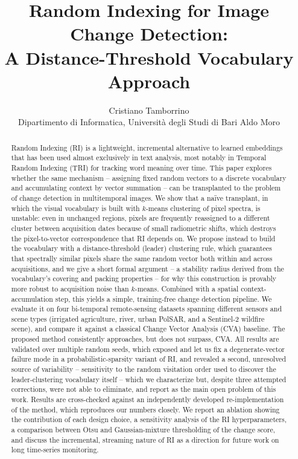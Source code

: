 \documentclass[11pt]{article}
\title{Random Indexing for Image Change Detection: \\
A Distance-Threshold Vocabulary Approach}
\author{Cristiano Tamborrino \\ Dipartimento di Informatica, Università degli Studi di Bari Aldo Moro}
\date{}
\begin{document}
\maketitle

\begin{abstract}
Random Indexing (RI) is a lightweight, incremental alternative to learned embeddings that has been used almost exclusively in text analysis, most notably in Temporal Random Indexing (TRI) for tracking word meaning over time. This paper explores whether the same mechanism -- assigning fixed random vectors to a discrete vocabulary and accumulating context by vector summation -- can be transplanted to the problem of change detection in multitemporal images. We show that a na\"ive transplant, in which the visual vocabulary is built with $k$-means clustering of pixel spectra, is unstable: even in unchanged regions, pixels are frequently reassigned to a different cluster between acquisition dates because of small radiometric shifts, which destroys the pixel-to-vector correspondence that RI depends on. We propose instead to build the vocabulary with a distance-threshold (leader) clustering rule, which guarantees that spectrally similar pixels share the same random vector both within and across acquisitions, and we give a short formal argument -- a stability radius derived from the vocabulary's covering and packing properties -- for why this construction is provably more robust to acquisition noise than $k$-means. Combined with a spatial context-accumulation step, this yields a simple, training-free change detection pipeline. We evaluate it on four bi-temporal remote-sensing datasets spanning different sensors and scene types (irrigated agriculture, river, urban PolSAR, and a Sentinel-2 wildfire scene), and compare it against a classical Change Vector Analysis (CVA) baseline. The proposed method consistently approaches, but does not surpass, CVA. All results are validated over multiple random seeds, which exposed and let us fix a degenerate-vector failure mode in a probabilistic-sparsity variant of RI, and revealed a second, unresolved source of variability -- sensitivity to the random visitation order used to discover the leader-clustering vocabulary itself -- which we characterize but, despite three attempted corrections, were not able to eliminate, and report as the main open problem of this work. Results are cross-checked against an independently developed re-implementation of the method, which reproduces our numbers closely. We report an ablation showing the contribution of each design choice, a sensitivity analysis of the RI hyperparameters, a comparison between Otsu and Gaussian-mixture thresholding of the change score, and discuss the incremental, streaming nature of RI as a direction for future work on long time-series monitoring.
\end{abstract}
\end{document}
